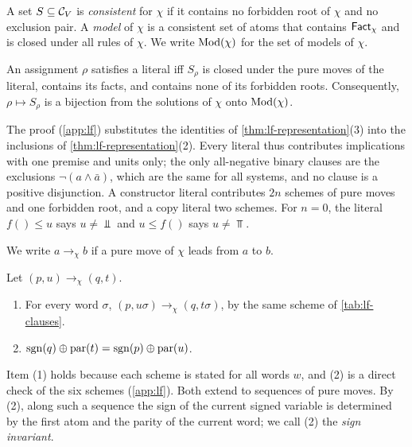\begin{definition}[Models]\label{def:lf-model}
A set $S\subseteq\mathcal C_V$ is \emph{consistent} for $\chi$ if it contains no
forbidden root of $\chi$ and no exclusion pair. A \emph{model} of $\chi$ is a
consistent set of atoms that contains $\mathsf{Fact}_\chi$ and is closed under all
rules of $\chi$. We write $\operatorname{Mod}(\chi)$ for the set of models of $\chi$.
\end{definition}

\begin{lemma}\label{lem:lf-clauses}
An assignment $\rho$ satisfies a literal iff $S_\rho$ is closed under the
pure moves of the literal, contains its facts, and contains none of
its forbidden roots. Consequently, $\rho\mapsto S_\rho$ is a bijection from
the solutions of $\chi$ onto $\operatorname{Mod}(\chi)$.
\end{lemma}

The proof (\cref{app:lf}) substitutes the identities of
\cref{thm:lf-representation}(3) into the inclusions of
\cref{thm:lf-representation}(2). Every literal thus contributes implications
with one premise and units only; the only all-negative binary clauses are the
exclusions $\neg(a\wedge\bar a)$, which are the same for all systems, and no
clause is a positive disjunction. A constructor literal contributes $2n$
schemes of pure moves and one forbidden root, and a copy literal two schemes.
For $n=0$, the literal $f()\le u$ says $u\ne\Bot$ and $u\le f()$ says
$u\ne\Top$.

We write $a\to_\chi b$ if a pure move of $\chi$ leads from $a$ to $b$.

\begin{lemma}\label{lem:lf-moves}
Let $(p,u)\to_\chi(q,t)$.
\begin{enumerate}[leftmargin=*]
\item For every word $\sigma$, $(p,u\sigma)\to_\chi(q,t\sigma)$, by the same
  scheme of \cref{tab:lf-clauses}.
\item $\operatorname{sgn}(q)\oplus\operatorname{par}(t)=\operatorname{sgn}(p)\oplus\operatorname{par}(u)$.
\end{enumerate}
\end{lemma}

Item (1) holds because each scheme is stated for all words $w$, and (2) is a
direct check of the six schemes (\cref{app:lf}). Both extend to sequences
of pure moves. By (2), along such a sequence the sign of the current signed
variable is determined by the first atom and the parity of the current word;
we call (2) the \emph{sign invariant}.

